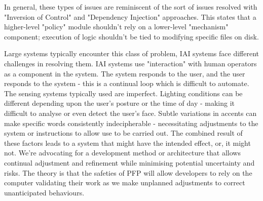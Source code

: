 
In general, these types of issues are reminiscent of the sort of issues resolved with "Inversion of Control" and "Dependency Injection" approaches.\cite{fowler2004inversion}
  This states that a higher-level "policy" module shouldn't rely on a lower-level "mechanism" component; execution of logic shouldn't be tied to modifying specific files on disk.

Large systems typically encounter this class of problem, IAI systems face different challenges in resolving them.
    IAI systems use "interaction" with human operators as a component in the system.
        The system responds to the user, and the user responds to the system - this is a continual loop which is difficult to automate.
    The sensing systems typically used are imperfect.
        Lighting conditions can be different depending upon the user's posture or the time of day - making it difficult to analyse or even detect the user's face.
        Subtle variations in accents can make specific words consistently indecipherable - necessitating adjustments to the system or instructions to allow use to be carried out.
    The combined result of these factors leads to a system that might have the intended effect, or, it might not.
        We're advocating for a development method or architecture that allows continual adjustment and refinement while minimising potential uncertainty and risks.
        The theory is that the safeties of PFP will allow developers to rely on the computer validating their work as we make unplanned adjustments to correct unanticipated behaviours.
